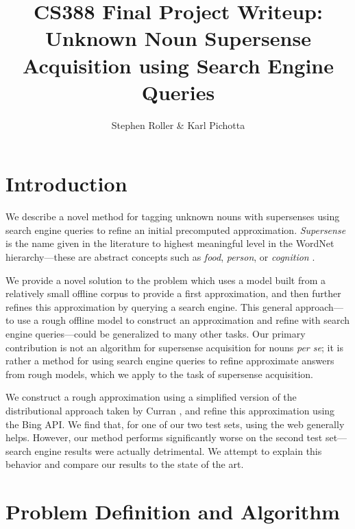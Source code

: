 \documentclass{article}
\title{CS388 Final Project Writeup:\\ 
Unknown Noun Supersense Acquisition using Search Engine Queries}
\author{Stephen Roller \& Karl Pichotta}
\begin{document}
\maketitle




\section{Introduction}


We describe a novel method for tagging unknown nouns with supersenses using search engine queries to refine an initial precomputed approximation.
{\em Supersense} is the name given in the literature to highest meaningful level in the WordNet \cite{wordnet} hierarchy---these are abstract concepts such as {\it food}, {\it person}, or {\it cognition} \cite{cj}.

We provide a novel solution to the problem which uses a model built from a relatively small offline corpus to provide a first approximation, and then further refines this approximation by querying a search engine.
This general approach---to use a rough offline model to construct an approximation and refine with search engine queries---could be generalized to many other tasks.
Our primary contribution is not an algorithm for supersense acquisition for nouns {\it per se}; it is rather a method for using search engine queries to refine approximate answers from rough models, which we apply to the task of supersense acquisition.

We construct a rough approximation using a simplified version of the distributional approach taken by Curran \cite{curran}, and refine this approximation using the Bing API.
We find that, for one of our two test sets, using the web generally helps.
However, our method performs significantly worse on the second test set---search engine results were actually detrimental. 
We attempt to explain this behavior and compare our results to the state of the art.


\section{Problem Definition and Algorithm}
\end{document}

